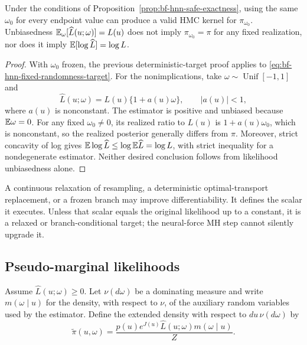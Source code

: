 \begin{proposition}
\label{prop:bf-hnn-frozen-randomness}
Under the conditions of Proposition~\ref{prop:bf-hnn-safe-exactness}, using the
same $\omega_0$ for every endpoint value can produce a valid HMC kernel for
$\pi_{\omega_0}$.  Unbiasedness
$\mathbb{E}_\omega[\widehat L(u;\omega)]=L(u)$ does not imply
$\pi_{\omega_0}=\pi$ for any fixed realization, nor does it imply
$\mathbb{E}[\log\widehat L]=\log L$.
\end{proposition}

\begin{proof}
With $\omega_0$ frozen, the previous deterministic-target proof applies to
\eqref{eq:bf-hnn-fixed-randomness-target}.  For the nonimplications, take
$\omega\sim\operatorname{Unif}[-1,1]$ and
\begin{equation}
 \widehat L(u;\omega)=L(u)\{1+a(u)\omega\},
 \qquad |a(u)|<1,
\end{equation}
where $a(u)$ is nonconstant.  The estimator is positive and unbiased because
$\mathbb{E}\omega=0$.  For any fixed $\omega_0\ne0$, its realized ratio to $L(u)$ is
$1+a(u)\omega_0$, which is nonconstant, so the realized posterior generally
differs from $\pi$.  Moreover, strict concavity of log gives
$\mathbb{E}\log\widehat L\le\log\mathbb{E}\widehat L=\log L$, with strict inequality for a
nondegenerate estimator.  Neither desired conclusion follows from likelihood
unbiasedness alone.
\end{proof}

A continuous relaxation of resampling, a deterministic optimal-transport
replacement, or a frozen branch may improve differentiability.  It defines
the scalar it executes.  Unless that scalar equals the original likelihood up
to a constant, it is a relaxed or branch-conditional target; the neural-force
MH step cannot silently upgrade it.

\subsection{Pseudo-marginal likelihoods}

Assume $\widehat L(u;\omega)\ge0$.  Let $\nu(d\omega)$ be a dominating measure
and write $m(\omega\mid u)$ for the density, with respect to $\nu$, of the
auxiliary random variables used by the estimator.  Define the extended
density with respect to $du\,\nu(d\omega)$ by
\begin{equation}
 \widetilde\pi(u,\omega)
 =\frac{p(u)e^{J(u)}\widehat L(u;\omega)
         m(\omega\mid u)}{Z}.
 \label{eq:bf-hnn-pseudo-marginal-target}
\end{equation}

